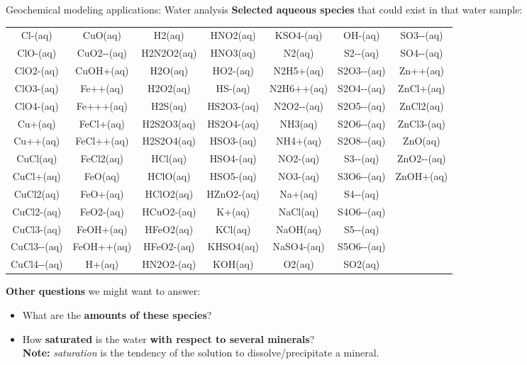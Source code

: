 %
\begin{frame}{Geochemical modeling applications: Water analysis}
\textbf{Selected aqueous species} that could exist in that water sample:
\vskip 1pt
{\scriptsize%
\begin{tabular*}{1\columnwidth}{@{\extracolsep{\fill}}ccccccc}
Cl-(aq) & CuO(aq) & H2(aq) & HNO2(aq) & KSO4-(aq) & OH-(aq) & SO3-{}-(aq)
\tabularnewline
ClO-(aq) & CuO2-{}-(aq) & H2N2O2(aq) & HNO3(aq) & N2(aq) & S2-{}-(aq) & SO4-{}-(aq)\tabularnewline
ClO2-(aq) & CuOH+(aq) & H2O(aq) & HO2-(aq) & N2H5+(aq) & S2O3-{}-(aq) & Zn++(aq)\tabularnewline
ClO3-(aq) & Fe++(aq) & H2O2(aq) & HS-(aq) & N2H6++(aq) & S2O4-{}-(aq) & ZnCl+(aq)\tabularnewline
ClO4-(aq) & Fe+++(aq) & H2S(aq) & HS2O3-(aq) & N2O2-{}-(aq) & S2O5-{}-(aq) & ZnCl2(aq)\tabularnewline
Cu+(aq) & FeCl+(aq) & H2S2O3(aq) & HS2O4-(aq) & NH3(aq) & S2O6-{}-(aq) & ZnCl3-(aq)\tabularnewline
Cu++(aq) & FeCl++(aq) & H2S2O4(aq) & HSO3-(aq) & NH4+(aq) & S2O8-{}-(aq) & ZnO(aq)\tabularnewline
CuCl(aq) & FeCl2(aq) & HCl(aq) & HSO4-(aq) & NO2-(aq) & S3-{}-(aq) & ZnO2-{}-(aq)\tabularnewline
CuCl+(aq) & FeO(aq) & HClO(aq) & HSO5-(aq) & NO3-(aq) & S3O6-{}-(aq) & ZnOH+(aq)\tabularnewline
CuCl2(aq) & FeO+(aq) & HClO2(aq) & HZnO2-(aq) & Na+(aq) & S4-{}-(aq) & \tabularnewline
CuCl2-(aq) & FeO2-(aq) & HCuO2-(aq) & K+(aq) & NaCl(aq) & S4O6-{}-(aq) & \tabularnewline
CuCl3-(aq) & FeOH+(aq) & HFeO2(aq) & KCl(aq) & NaOH(aq) & S5-{}-(aq) & \tabularnewline
CuCl3-{}-(aq) & FeOH++(aq) & HFeO2-(aq) & KHSO4(aq) & NaSO4-(aq) & S5O6-{}-(aq) & \tabularnewline
CuCl4-{}-(aq) & H+(aq) & HN2O2-(aq) & KOH(aq) & O2(aq) & SO2(aq) & \tabularnewline
\end{tabular*}}

\pause
\vskip 5pt
\alert{\textbf{Other questions}} we might want to answer: 
\begin{itemize}
\item What are the \textbf{amounts of these species}? 
\item How \textbf{saturated} is the water \textbf{with respect to several minerals}? \\
\textbf{Note:}  \emph{saturation} is the tendency of the solution to dissolve/precipitate a mineral.
\end{itemize}
\end{frame}

